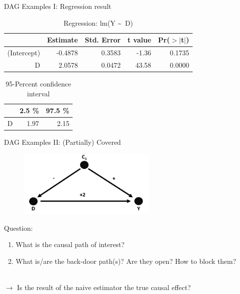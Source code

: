 \documentclass{beamer}\usepackage[]{graphicx}\usepackage[]{xcolor}
\begin{document}
\begin{frame}[fragile]{DAG Examples I: Regression result}
\begin{table}[ht]
\centering
\begin{tabular}{rrrrr}
  \hline
 & Estimate & Std. Error & t value & Pr($>$$|$t$|$) \\ 
  \hline
(Intercept) & -0.4878 & 0.3583 & -1.36 & 0.1735 \\ 
  D & 2.0578 & 0.0472 & 43.58 & 0.0000 \\ 
   \hline
\end{tabular}
\caption{Regression: lm(Y \textasciitilde ~D)} 
\end{table}
\begin{table}[ht]
\centering
\begin{tabular}{rrr}
  \hline
 & 2.5 \% & 97.5 \% \\ 
  \hline
D & 1.97 & 2.15 \\ 
   \hline
\end{tabular}
\caption{95-Percent confidence interval} 
\end{table}

\end{frame}





\begin{frame}{DAG Examples II: (Partially) Covered}
\\[1em]
\begin{figure}
\includegraphics[width=0.6\textwidth]{Graphics/2.SimpleConfounding-Covered.png}
\end{figure}
Question:
\begin{enumerate}
\item What is the causal path of interest?
\item What is/are the back-door path(s)? Are they open? How to block them?
\end{enumerate}
\\[1em]
$\rightarrow$ Is the result of the naive estimator the true causal effect?
\end{frame}
\end{document}
